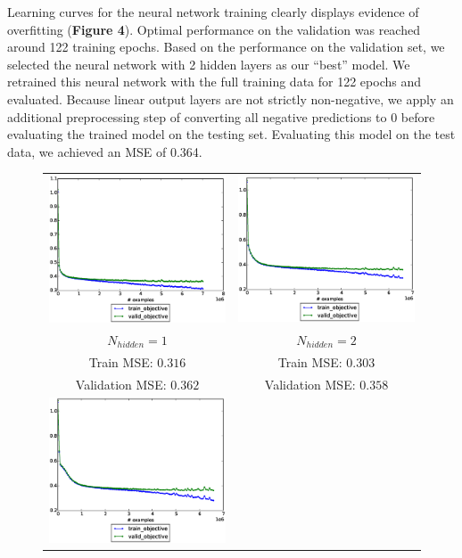 \documentclass[12pt] {article}
\renewcommand{\baselinestretch}{1.3} %
\begin{document}
Learning curves for the neural network training clearly displays evidence of overfitting (\textbf{Figure 4}). Optimal performance on the validation was reached around 122 training epochs. Based on the performance on the validation set, we selected the neural network with 2 hidden layers as our ``best'' model. We retrained this neural network with the full training data for 122 epochs and evaluated. Because linear output layers are not strictly non-negative, we apply an additional preprocessing step of converting all negative predictions to 0 before evaluating the trained model on the testing set. Evaluating this model on the test data, we achieved an MSE of 0.364.
\renewcommand{\baselinestretch}{1.0} %
\begin{figure}[h!] \centering
\begin{tabular}{cc}
\includegraphics[trim = 0mm 20mm 0mm 10mm, clip=true, width=.45\textwidth]{figdir/nn_mse_1.eps} &
\includegraphics[trim = 0mm 20mm 0mm 10mm, clip=true, width=.45\textwidth]{figdir/nn_mse_2.eps} \\
$N_{hidden}=1$ & $N_{hidden}=2$ \\
Train MSE: $0.316$ & Train MSE: $0.303$ \\
Validation MSE: $0.362$ & Validation MSE: $0.358$ \\
\includegraphics[trim = 0mm 20mm 0mm 10mm, clip=true, width=.45\textwidth]{figdir/nn_mse_3.eps} &

\end{tabular}
\end{figure}
\end{document}
